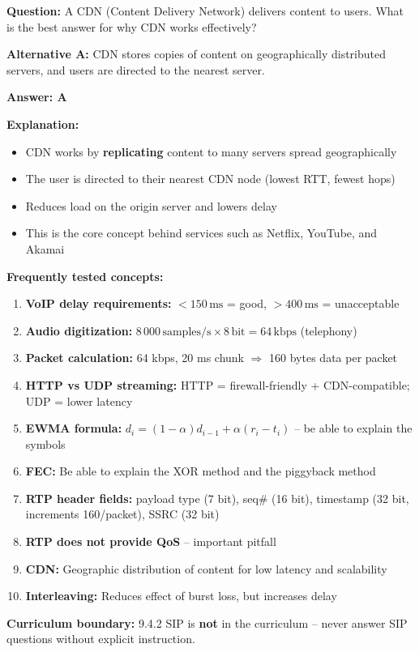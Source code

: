 \begin{tcolorbox}[exambox, title=S2025 -- Part I Q1 -- CDN content delivery]
\textbf{Question:} A CDN (Content Delivery Network) delivers content to users. What is the best answer for why CDN works effectively?

\medskip
\textbf{Alternative A:} CDN stores copies of content on geographically distributed servers, and users are directed to the nearest server.

\medskip
\textbf{Answer: A}

\medskip
\textbf{Explanation:}
\begin{itemize}[nosep]
  \item CDN works by \textbf{replicating} content to many servers spread geographically
  \item The user is directed to their nearest CDN node (lowest RTT, fewest hops)
  \item Reduces load on the origin server and lowers delay
  \item This is the core concept behind services such as Netflix, YouTube, and Akamai
\end{itemize}
\end{tcolorbox}

\begin{tcolorbox}[exambox, title=Typical exam topics -- Ch. 9]
\textbf{Frequently tested concepts:}

\begin{enumerate}[nosep]
  \item \textbf{VoIP delay requirements:} $<150\,\text{ms}$ = good, $>400\,\text{ms}$ = unacceptable
  \item \textbf{Audio digitization:} $8\,000\,\text{samples/s} \times 8\,\text{bit} = 64\,\text{kbps}$ (telephony)
  \item \textbf{Packet calculation:} 64 kbps, 20 ms chunk $\Rightarrow$ 160 bytes data per packet
  \item \textbf{HTTP vs UDP streaming:} HTTP = firewall-friendly + CDN-compatible; UDP = lower latency
  \item \textbf{EWMA formula:} $d_i = (1-\alpha)d_{i-1} + \alpha(r_i - t_i)$ -- be able to explain the symbols
  \item \textbf{FEC:} Be able to explain the XOR method and the piggyback method
  \item \textbf{RTP header fields:} payload type (7 bit), seq\# (16 bit), timestamp (32 bit, increments 160/packet), SSRC (32 bit)
  \item \textbf{RTP does not provide QoS} -- important pitfall
  \item \textbf{CDN:} Geographic distribution of content for low latency and scalability
  \item \textbf{Interleaving:} Reduces effect of burst loss, but increases delay
\end{enumerate}

\medskip
\textbf{Curriculum boundary:} 9.4.2 SIP is \textbf{not} in the curriculum -- never answer SIP questions without explicit instruction.
\end{tcolorbox}
